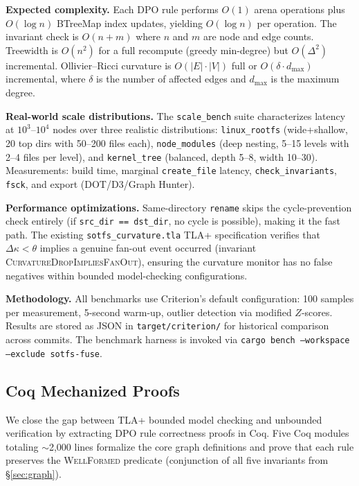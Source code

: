 \documentclass[11pt,a4paper]{article}
\theoremstyle{definition}
\begin{document}
\textbf{Expected complexity.}  Each DPO rule performs $O(1)$ arena
operations plus $O(\log n)$ BTreeMap index updates, yielding $O(\log n)$
per operation.  The invariant check is $O(n + m)$ where $n$ and $m$ are
node and edge counts.  Treewidth is $O(n^2)$ for a full recompute
(greedy min-degree) but $O(\Delta^2)$ incremental.  Ollivier--Ricci
curvature is $O(|E| \cdot |V|)$ full or $O(\delta \cdot d_{\max})$
incremental, where $\delta$ is the number of affected edges and
$d_{\max}$ is the maximum degree.

\textbf{Real-world scale distributions.}  The \texttt{scale\_bench} suite
characterizes latency at $10^3$--$10^4$ nodes over three realistic
distributions: \texttt{linux\_rootfs} (wide+shallow, 20 top dirs with
50--200 files each), \texttt{node\_modules} (deep nesting, 5--15 levels with
2--4 files per level), and \texttt{kernel\_tree} (balanced, depth 5--8, width
10--30).  Measurements: build time, marginal \texttt{create\_file} latency,
\texttt{check\_invariants}, \texttt{fsck}, and export (DOT/D3/Graph Hunter).

\textbf{Performance optimizations.}  Same-directory \texttt{rename} skips the
cycle-prevention check entirely (if \texttt{src\_dir == dst\_dir}, no cycle
is possible), making it the fast path.  The existing \texttt{sotfs\_curvature.tla}
TLA+ specification verifies that $\Delta\kappa < \theta$ implies a genuine
fan-out event occurred (invariant \textsc{CurvatureDropImpliesFanOut}),
ensuring the curvature monitor has no false negatives within bounded
model-checking configurations.

\textbf{Methodology.}  All benchmarks use Criterion's default configuration:
100 samples per measurement, 5-second warm-up, outlier detection via
modified $Z$-scores.  Results are stored as JSON in \texttt{target/criterion/}
for historical comparison across commits.  The benchmark harness is
invoked via \texttt{cargo bench --workspace --exclude sotfs-fuse}.

\subsection{Coq Mechanized Proofs}\label{sec:coq}

We close the gap between TLA+ bounded model checking and unbounded verification
by extracting DPO rule correctness proofs in Coq.  Five Coq modules totaling
$\sim$2{,}000 lines formalize the core graph definitions and prove that each
rule preserves the \textsc{WellFormed} predicate (conjunction of all five
invariants from \S\ref{sec:graph}).
\end{document}
